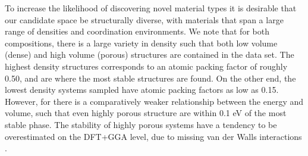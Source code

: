 To increase the likelihood of discovering novel material types it is desirable that our candidate space be structurally diverse, with materials that span a large range of densities and coordination environments.
%
We note that for both compositions, there is a large variety in density such that both low volume (dense) and high volume (porous) structures are contained in the data set.
%
The highest density structures corresponds to an atomic packing factor of roughly 0.50, and are where the most stable structures are found.
%
On the other end, the lowest density systems sampled have atomic packing factors as low as 0.15.
%
However, for \IrOthree there is a comparatively weaker relationship between the energy and volume,
such that even highly porous structure are within 0.1 eV of the most stable phase.
%
The stability of highly porous systems have a tendency to be overestimated on the DFT+GGA level, due to missing van der Walls interactions \cite{}.
%
%
%
%

